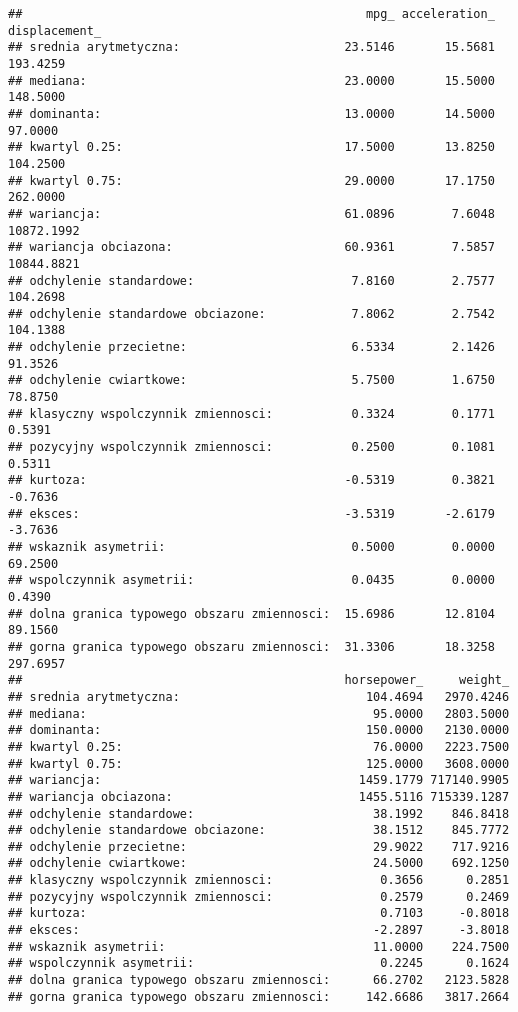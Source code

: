 \documentclass[
]{article}
\begin{document}
\begin{verbatim}
##                                                mpg_ acceleration_ displacement_
## srednia arytmetyczna:                       23.5146       15.5681      193.4259
## mediana:                                    23.0000       15.5000      148.5000
## dominanta:                                  13.0000       14.5000       97.0000
## kwartyl 0.25:                               17.5000       13.8250      104.2500
## kwartyl 0.75:                               29.0000       17.1750      262.0000
## wariancja:                                  61.0896        7.6048    10872.1992
## wariancja obciazona:                        60.9361        7.5857    10844.8821
## odchylenie standardowe:                      7.8160        2.7577      104.2698
## odchylenie standardowe obciazone:            7.8062        2.7542      104.1388
## odchylenie przecietne:                       6.5334        2.1426       91.3526
## odchylenie cwiartkowe:                       5.7500        1.6750       78.8750
## klasyczny wspolczynnik zmiennosci:           0.3324        0.1771        0.5391
## pozycyjny wspolczynnik zmiennosci:           0.2500        0.1081        0.5311
## kurtoza:                                    -0.5319        0.3821       -0.7636
## eksces:                                     -3.5319       -2.6179       -3.7636
## wskaznik asymetrii:                          0.5000        0.0000       69.2500
## wspolczynnik asymetrii:                      0.0435        0.0000        0.4390
## dolna granica typowego obszaru zmiennosci:  15.6986       12.8104       89.1560
## gorna granica typowego obszaru zmiennosci:  31.3306       18.3258      297.6957
##                                             horsepower_     weight_
## srednia arytmetyczna:                          104.4694   2970.4246
## mediana:                                        95.0000   2803.5000
## dominanta:                                     150.0000   2130.0000
## kwartyl 0.25:                                   76.0000   2223.7500
## kwartyl 0.75:                                  125.0000   3608.0000
## wariancja:                                    1459.1779 717140.9905
## wariancja obciazona:                          1455.5116 715339.1287
## odchylenie standardowe:                         38.1992    846.8418
## odchylenie standardowe obciazone:               38.1512    845.7772
## odchylenie przecietne:                          29.9022    717.9216
## odchylenie cwiartkowe:                          24.5000    692.1250
## klasyczny wspolczynnik zmiennosci:               0.3656      0.2851
## pozycyjny wspolczynnik zmiennosci:               0.2579      0.2469
## kurtoza:                                         0.7103     -0.8018
## eksces:                                         -2.2897     -3.8018
## wskaznik asymetrii:                             11.0000    224.7500
## wspolczynnik asymetrii:                          0.2245      0.1624
## dolna granica typowego obszaru zmiennosci:      66.2702   2123.5828
## gorna granica typowego obszaru zmiennosci:     142.6686   3817.2664
\end{verbatim}
\end{document}
